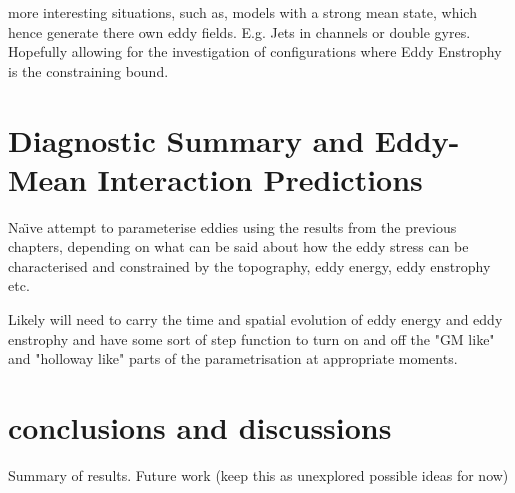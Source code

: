 \documentclass[10pt,a4paper]{article}
\begin{document}
more interesting situations, such as, models
with a strong mean state, which hence
generate there own eddy fields. E.g. Jets in
channels or double gyres. Hopefully allowing 
for the investigation of configurations where 
Eddy Enstrophy is the constraining bound.


\section{Diagnostic Summary and Eddy-Mean Interaction Predictions}

Na\"{\i}ve attempt to parameterise eddies using the 
results from the previous chapters, depending
on what can be said about how the eddy stress can
be characterised and constrained by the topography,
eddy energy, eddy enstrophy etc. 

Likely will need to carry the time and spatial
evolution of eddy energy and eddy enstrophy and have
some sort of step function to turn on and off the
"GM like" and "holloway like" parts of the parametrisation at appropriate moments.


\section{conclusions and discussions}

Summary of results.
Future work (keep this as unexplored possible ideas for now)
\end{document}
